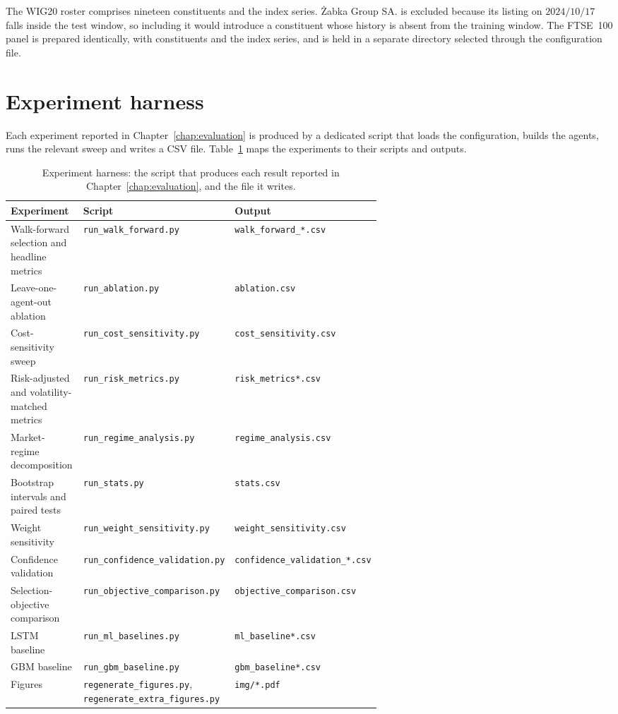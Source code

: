 The WIG20 roster comprises nineteen constituents and the index series. \.{Z}abka Group SA. is excluded because its listing on $2024/10/17$ falls inside the test window, so including it would introduce a constituent whose history is absent from the training window. The FTSE~100 panel is prepared identically, with \FtseNsymbols{} constituents and the index series, and is held in a separate directory selected through the configuration file.

\section{Experiment harness}\label{sec:harness}

Each experiment reported in Chapter~\ref{chap:evaluation} is produced by a dedicated script that loads the configuration, builds the agents, runs the relevant sweep and writes a CSV file. Table~\ref{tab:harness} maps the experiments to their scripts and outputs.

\begin{table}[!htbp]
\centering
\footnotesize
\caption{Experiment harness: the script that produces each result reported in Chapter~\ref{chap:evaluation}, and the file it writes.}
\label{tab:harness}
\begin{tabularx}{\linewidth}{@{}>{\raggedright\arraybackslash}p{0.27\linewidth}>{\raggedright\arraybackslash}p{0.34\linewidth}X@{}}
\toprule
\textbf{Experiment} & \textbf{Script} & \textbf{Output} \\
\midrule
Walk-forward selection and headline metrics & \texttt{run\_walk\_forward.py} & \texttt{walk\_forward\_*.csv} \\
Leave-one-agent-out ablation & \texttt{run\_ablation.py} & \texttt{ablation.csv} \\
Cost-sensitivity sweep & \texttt{run\_cost\_sensitivity.py} & \texttt{cost\_sensitivity.csv} \\
Risk-adjusted and volatility-matched metrics & \texttt{run\_risk\_metrics.py} & \texttt{risk\_metrics*.csv} \\
Market-regime decomposition & \texttt{run\_regime\_analysis.py} & \texttt{regime\_analysis.csv} \\
Bootstrap intervals and paired tests & \texttt{run\_stats.py} & \texttt{stats.csv} \\
Weight sensitivity & \texttt{run\_weight\_sensitivity.py} & \texttt{weight\_sensitivity.csv} \\
Confidence validation & \texttt{run\_confidence\_validation.py} & \texttt{confidence\_validation\_*.csv} \\
Selection-objective comparison & \texttt{run\_objective\_comparison.py} & \texttt{objective\_comparison.csv} \\
LSTM baseline & \texttt{run\_ml\_baselines.py} & \texttt{ml\_baseline*.csv} \\
GBM baseline & \texttt{run\_gbm\_baseline.py} & \texttt{gbm\_baseline*.csv} \\
Figures & \texttt{regenerate\_figures.py}, \texttt{regenerate\_extra\_figures.py} & \texttt{img/*.pdf} \\
\bottomrule
\end{tabularx}
\end{table}

